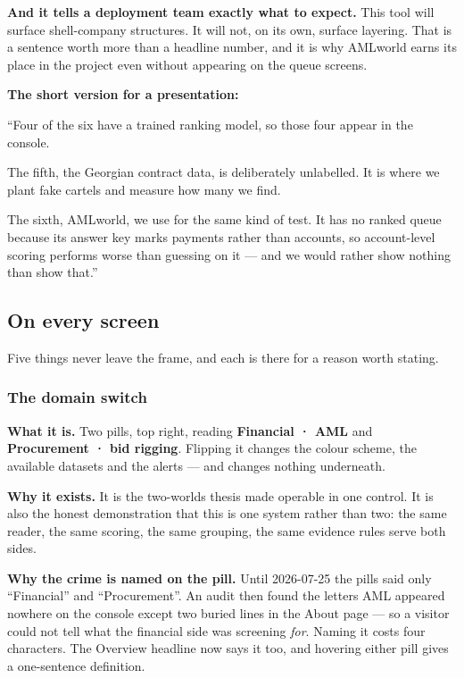 \documentclass[11pt,a4paper]{article}
\begin{document}
\textbf{And it tells a deployment team exactly what to expect.} This tool will
surface shell-company structures. It will not, on its own, surface layering.
That is a sentence worth more than a headline number, and it is why AMLworld
earns its place in the project even without appearing on the queue screens.

\begin{plain}
\textbf{The short version for a presentation:}

``Four of the six have a trained ranking model, so those four appear in the
console.

The fifth, the Georgian contract data, is deliberately unlabelled. It is where
we plant fake cartels and measure how many we find.

The sixth, AMLworld, we use for the same kind of test. It has no ranked queue
because its answer key marks payments rather than accounts, so account-level
scoring performs worse than guessing on it --- and we would rather show nothing
than show that.''
\end{plain}

\subsection{On every screen}

Five things never leave the frame, and each is there for a reason worth stating.

\subsubsection*{The domain switch}

\textbf{What it is.} Two pills, top right, reading \textbf{Financial · AML} and
\textbf{Procurement · bid rigging}. Flipping it changes the colour scheme, the
available datasets and the alerts --- and changes nothing underneath.

\textbf{Why it exists.} It is the two-worlds thesis made operable in one
control. It is also the honest demonstration that this is one system rather
than two: the same reader, the same scoring, the same grouping, the same
evidence rules serve both sides.

\textbf{Why the crime is named on the pill.} Until 2026-07-25 the pills said
only ``Financial'' and ``Procurement''. An audit then found the letters AML
appeared nowhere on the console except two buried lines in the About page --- so
a visitor could not tell what the financial side was screening \emph{for}. Naming
it costs four characters. The Overview headline now says it too, and hovering
either pill gives a one-sentence definition.
\end{document}
